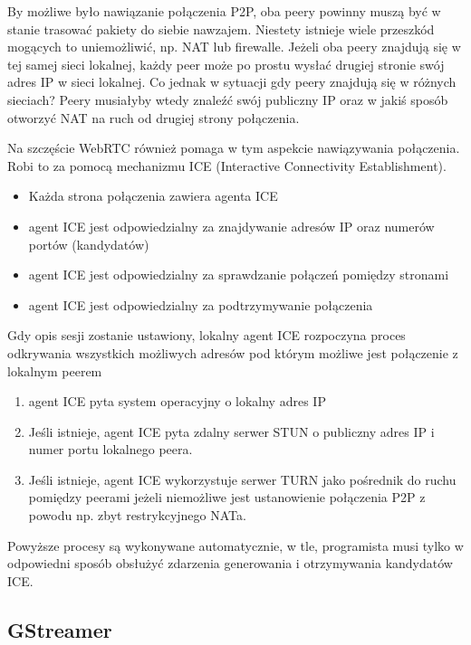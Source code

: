 By możliwe było nawiązanie połączenia P2P, oba peery powinny muszą być w stanie trasować pakiety do
siebie nawzajem. Niestety istnieje wiele przeszkód mogących to uniemożliwić, np. NAT lub firewalle.
Jeżeli oba peery znajdują się w tej samej sieci lokalnej, każdy peer może po prostu wysłać drugiej
stronie swój adres IP w sieci lokalnej. Co jednak w sytuacji gdy peery znajdują się w różnych
sieciach? Peery musiałyby wtedy znaleźć swój publiczny IP oraz w jakiś sposób otworzyć NAT na ruch
od drugiej strony połączenia.

Na szczęście WebRTC również pomaga w tym aspekcie nawiązywania połączenia. Robi to za pomocą
mechanizmu ICE (Interactive Connectivity Establishment).

\begin{itemize}
    \item Każda strona połączenia zawiera agenta ICE
    \item agent ICE jest odpowiedzialny za znajdywanie adresów IP oraz numerów portów (kandydatów)
    \item agent ICE jest odpowiedzialny za sprawdzanie połączeń pomiędzy stronami
    \item agent ICE jest odpowiedzialny za podtrzymywanie połączenia
\end{itemize}

Gdy opis sesji zostanie ustawiony, lokalny agent ICE rozpoczyna proces odkrywania wszystkich
możliwych adresów pod którym możliwe jest połączenie z lokalnym peerem

\begin{enumerate}
    \item agent ICE pyta system operacyjny o lokalny adres IP
    \item Jeśli istnieje, agent ICE pyta zdalny serwer STUN o publiczny adres IP i numer portu
          lokalnego peera.
    \item Jeśli istnieje, agent ICE wykorzystuje serwer TURN jako pośrednik do ruchu pomiędzy
          peerami jeżeli niemożliwe jest ustanowienie połączenia P2P z powodu np. zbyt restrykcyjnego NATa.
\end{enumerate}

Powyższe procesy są wykonywane automatycznie, w tle, programista musi tylko w odpowiedni sposób
obsłużyć zdarzenia generowania i otrzymywania kandydatów ICE.

\subsection{GStreamer}

